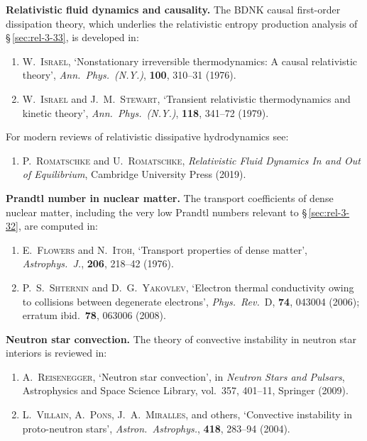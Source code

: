 \noindent \textbf{Relativistic fluid dynamics and causality.}  The
BDNK causal first-order dissipation theory, which underlies the
relativistic entropy production analysis of \S\,\ref{sec:rel-3-33}, is
developed in:

\begin{enumerate}
\item[R1.] W.~\textsc{Israel}, `Nonstationary irreversible thermodynamics:
  A causal relativistic theory', \emph{Ann.\ Phys.\ (N.Y.)}, \textbf{100},
  310--31 (1976).

\item[R2.] W.~\textsc{Israel} and J.~M.~\textsc{Stewart}, `Transient
  relativistic thermodynamics and kinetic theory', \emph{Ann.\ Phys.\
  (N.Y.)}, \textbf{118}, 341--72 (1979).
\end{enumerate}

\noindent For modern reviews of relativistic dissipative hydrodynamics see:

\begin{enumerate}
\item[R3.] P.~\textsc{Romatschke} and U.~\textsc{Romatschke},
  \emph{Relativistic Fluid Dynamics In and Out of Equilibrium}, Cambridge
  University Press (2019).
\end{enumerate}

\noindent \textbf{Prandtl number in nuclear matter.}  The transport
coefficients of dense nuclear matter, including the very low Prandtl
numbers relevant to \S\,\ref{sec:rel-3-32}, are computed in:

\begin{enumerate}
\item[R4.] E.~\textsc{Flowers} and N.~\textsc{Itoh}, `Transport
  properties of dense matter', \emph{Astrophys.\ J.}, \textbf{206},
  218--42 (1976).

\item[R5.] P.~S.~\textsc{Shternin} and D.~G.~\textsc{Yakovlev},
  `Electron thermal conductivity owing to collisions between degenerate
  electrons', \emph{Phys.\ Rev.}~D, \textbf{74}, 043004 (2006);
  erratum ibid.\ \textbf{78}, 063006 (2008).
\end{enumerate}

\noindent \textbf{Neutron star convection.}  The theory of convective
instability in neutron star interiors is reviewed in:

\begin{enumerate}
\item[R6.] A.~\textsc{Reisenegger}, `Neutron star convection', in
  \emph{Neutron Stars and Pulsars}, Astrophysics and Space Science
  Library, vol.~357, 401--11, Springer (2009).

\item[R7.] L.~\textsc{Villain}, A.~\textsc{Pons}, J.~A.~\textsc{Miralles},
  and others, `Convective instability in proto-neutron stars', \emph{Astron.\
  Astrophys.}, \textbf{418}, 283--94 (2004).
\end{enumerate}

